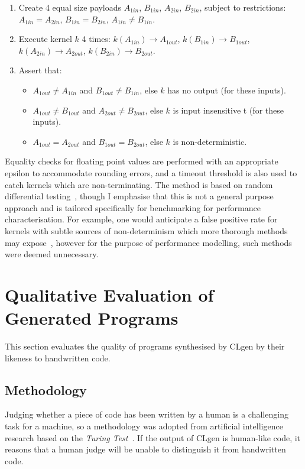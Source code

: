 \begin{enumerate}
\item Create 4 equal size payloads $A_{1in}$, $B_{1in}$, $A_{2in}$,
  $B_{2in}$, subject to restrictions: $A_{1in}=A_{2in}$,
  $B_{1in}=B_{2in}$, $A_{1in} \ne B_{1in}$.
\item Execute kernel $k$ 4 times: $k(A_{1in}) \rightarrow A_{1out}$,
  $k(B_{1in}) \rightarrow B_{1out}$,
  $k(A_{2in}) \rightarrow A_{2out}$,
  $k(B_{2in}) \rightarrow B_{2out}$.
\item Assert that:
  \begin{itemize}
  \item $A_{1out} \ne A_{1in}$ and $B_{1out} \ne B_{1in}$, else $k$ has no
  output (for these inputs).%
  \item $A_{1out} \ne B_{1out}$ and $A_{2out} \ne B_{2out}$, else $k$ is input insensitive t (for these inputs).%
  \item $A_{1out}=A_{2out}$ and $B_{1out}=B_{2out}$, else $k$ is
  non-deterministic.
  \end{itemize}
\end{enumerate}

Equality checks for floating point values are performed with an appropriate epsilon to accommodate rounding errors, and a timeout threshold is also used to catch kernels which are non-terminating. The method is based on random differential testing~\cite{McKeeman1998}, though I emphasise that this is not a general purpose approach and is tailored specifically for benchmarking for performance characterisation. For example, one would anticipate a false positive rate for kernels with subtle sources of non-determinism which more thorough methods may expose~\cite{Betts2012,Price2015,Sorensen2016}, however for the purpose of performance modelling, such methods were deemed unnecessary.


\section{Qualitative Evaluation of Generated Programs}
\label{sec:clgen-qualitative-evaluation}

This section evaluates the quality of programs synthesised by CLgen by their likeness to handwritten code.


\subsection{Methodology}

Judging whether a piece of code has been written by a human is a challenging task for a machine, so a methodology was adopted from artificial intelligence research based on the \emph{Turing Test}~\cite{Gao2015a,Zhang2016,Vinyals}. If the output of CLgen is human-like code, it reasons that a human judge will be unable to distinguish it from handwritten code.

